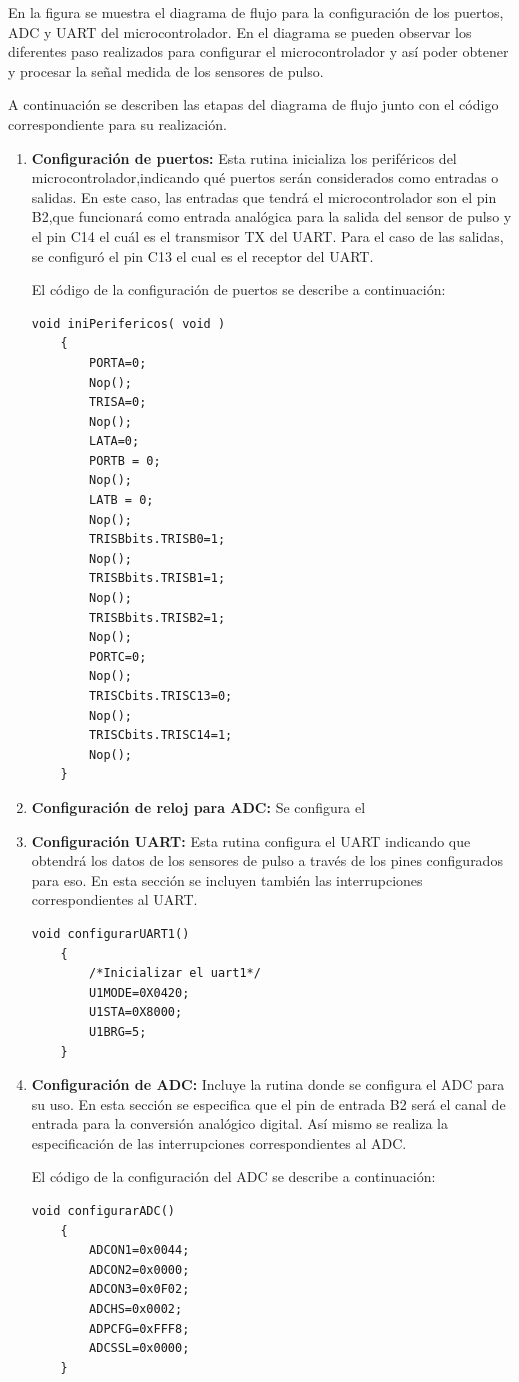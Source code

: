 En la figura se muestra el diagrama de flujo para la configuración de los puertos, ADC y UART del microcontrolador. En el diagrama se pueden observar los diferentes paso realizados para configurar el microcontrolador y así poder obtener y procesar la señal medida de los sensores de pulso.

A continuación se describen las etapas del diagrama de flujo junto con el código correspondiente para su realización.

\begin{enumerate}
	\item \textbf{Configuración de puertos:} Esta rutina inicializa los periféricos del microcontrolador,indicando qué puertos serán considerados como entradas o salidas. En este caso, las entradas que tendrá el microcontrolador son el pin B2,que funcionará como entrada analógica para la salida del sensor de pulso y el pin C14 el cuál es el transmisor TX del UART. Para el caso de las salidas, se configuró el pin C13 el cual es el receptor del UART. 
	
	\lstset{language=c}
	El código de la configuración de puertos se describe a continuación:
	\begin{lstlisting}[frame=single]
	void iniPerifericos( void )
	{
		PORTA=0;
		Nop();
		TRISA=0;
		Nop();
		LATA=0;
		PORTB = 0;
		Nop();
		LATB = 0;
		Nop();
		TRISBbits.TRISB0=1;
		Nop();
		TRISBbits.TRISB1=1;
		Nop();
		TRISBbits.TRISB2=1;
		Nop();
		PORTC=0;
		Nop();
		TRISCbits.TRISC13=0;
		Nop();
		TRISCbits.TRISC14=1;
		Nop();
	}
	\end{lstlisting}
	
	\item \textbf{Configuración de reloj para ADC:} Se configura el 
	
	\item \textbf{Configuración UART:} Esta rutina configura el UART indicando que obtendrá los datos de los sensores de pulso a través de los pines configurados para eso. En esta sección se incluyen también las interrupciones correspondientes al UART.
	\begin{lstlisting}[frame=single]
	void configurarUART1()
	{
		/*Inicializar el uart1*/
		U1MODE=0X0420;
		U1STA=0X8000;
		U1BRG=5;
	}
	\end{lstlisting}
	
	\item \textbf{Configuración de ADC:} Incluye la rutina donde se configura el ADC para su uso. En esta sección se especifica que el pin de entrada B2 será el canal de entrada para la conversión analógico digital. Así mismo se realiza la especificación de las interrupciones correspondientes al ADC.
	
	\lstset{language=c}
	El código de la configuración del ADC se describe a continuación:
	\begin{lstlisting}[frame=single]
	void configurarADC()
	{
		ADCON1=0x0044;
		ADCON2=0x0000;
		ADCON3=0x0F02;
		ADCHS=0x0002;
		ADPCFG=0xFFF8;
		ADCSSL=0x0000;
	}
	\end{lstlisting}

\end{enumerate}

